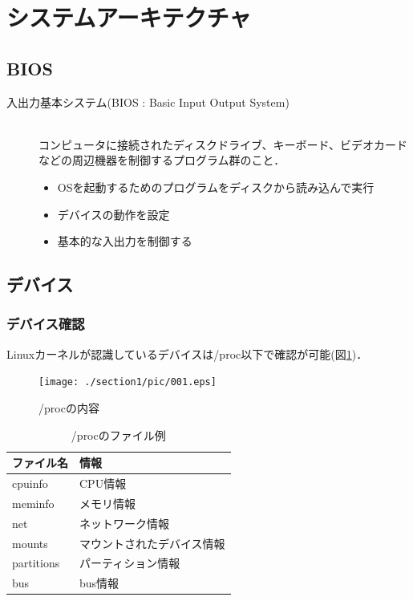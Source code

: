 \section{システムアーキテクチャ}
\subsection{BIOS}
\begin{description}
	\item[入出力基本システム(BIOS : Basic Input Output System)]\mbox{}\\
	コンピュータに接続されたディスクドライブ、キーボード、ビデオカードなどの周辺機器を制御するプログラム群のこと．
		\begin{itemize}
			\item{OSを起動するためのプログラムをディスクから読み込んで実行}
			\item{デバイスの動作を設定}
			\item{基本的な入出力を制御する}
		\end{itemize}
\end{description}

\subsection{デバイス}
\subsubsection{デバイス確認}
Linuxカーネルが認識しているデバイスは/proc以下で確認が可能(図\ref{001})．
\begin{figure}[!h]
	\begin{center}
		\texttt{[image: ./section1/pic/001.eps]}
		\caption{/procの内容}
		\label{001}
	\end{center}
\end{figure}

\begin{table}[htb]
  \begin{center}
    \begin{tabular}{|l|l|} \hline
      ファイル名 & 情報 \\ \hline
      cpuinfo & CPU情報 \\ \hline
      meminfo & メモリ情報 \\ \hline
      net & ネットワーク情報 \\ \hline
      mounts & マウントされたデバイス情報 \\ \hline
      partitions & パーティション情報 \\ \hline
      bus & bus情報 \\ \hline
    \end{tabular}
    \caption{/procのファイル例}
  \end{center}
\end{table}

